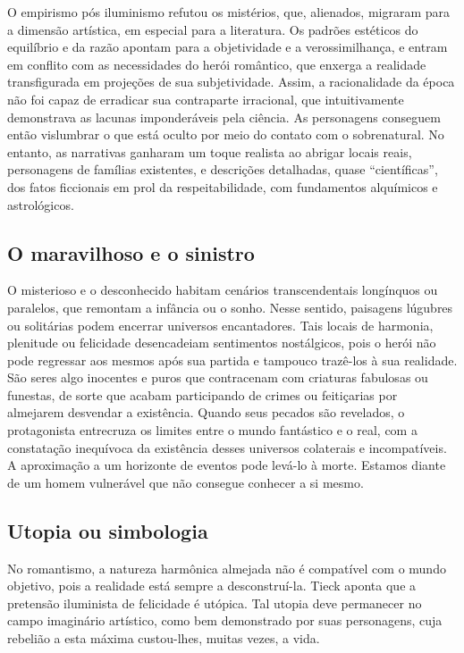 \documentclass[11pt]{extarticle}
\begin{document}
O empirismo pós iluminismo refutou os mistérios, que, alienados,
migraram para a dimensão artística, em especial para a literatura. Os
padrões estéticos do equilíbrio e da razão apontam para a objetividade e
a verossimilhança, e entram em conflito com as necessidades do herói
romântico, que enxerga a realidade transfigurada em projeções de sua
subjetividade. Assim, a racionalidade da época não foi capaz de
erradicar sua contraparte irracional, que intuitivamente demonstrava as
lacunas imponderáveis pela ciência. As personagens conseguem então
vislumbrar o que está oculto por meio do contato com o sobrenatural. No
entanto, as narrativas ganharam um toque realista ao abrigar locais
reais, personagens de famílias existentes, e descrições detalhadas,
quase ``científicas'', dos fatos ficcionais em prol da respeitabilidade,
com fundamentos alquímicos e astrológicos.

\subsection{O maravilhoso e o sinistro}

O misterioso e o desconhecido habitam cenários transcendentais
longínquos ou paralelos, que remontam a infância ou o sonho. Nesse
sentido, paisagens lúgubres ou solitárias podem encerrar universos
encantadores. Tais locais de harmonia, plenitude ou felicidade
desencadeiam sentimentos nostálgicos, pois o herói não pode regressar
aos mesmos após sua partida e tampouco trazê-los à sua realidade. São
seres algo inocentes e puros que contracenam com criaturas fabulosas ou
funestas, de sorte que acabam participando de crimes ou feitiçarias por
almejarem desvendar a existência. Quando seus pecados são revelados, o
protagonista entrecruza os limites entre o mundo fantástico e o real,
com a constatação inequívoca da existência desses universos colaterais e
incompatíveis. A aproximação a um horizonte de eventos pode levá-lo à
morte. Estamos diante de um homem vulnerável que não consegue conhecer a
si mesmo.


\subsection{Utopia ou simbologia}

No romantismo, a natureza harmônica almejada não é compatível com o
mundo objetivo, pois a realidade está sempre a desconstruí-la. Tieck
aponta que a pretensão iluminista de felicidade é utópica. Tal utopia
deve permanecer no campo imaginário artístico, como bem demonstrado por
suas personagens, cuja rebelião a esta máxima custou-lhes, muitas vezes,
a vida.
\end{document}
